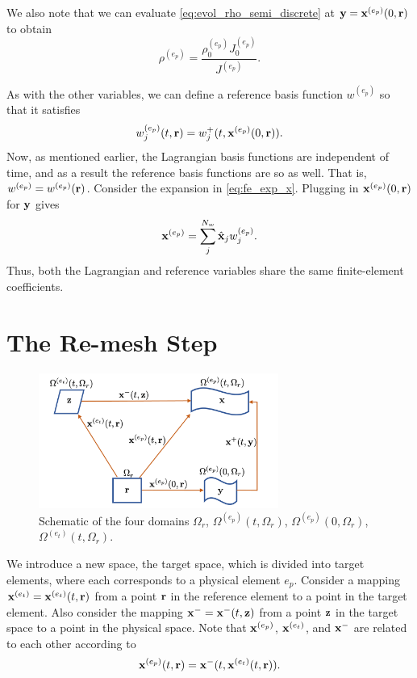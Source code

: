 \documentclass[11pt]{report}
\begin{document}
We also note that we can evaluate \cref{eq:evol_rho_semi_discrete} at $\mathbf{y} = \mathbf{x}^{(e_p)}(0,\mathbf{r})$ to obtain
\begin{equation}
    \rho^{(e_p)} = \frac{\rho^{(e_p)}_0 J^{(e_p)}_0}{J^{(e_p)}}.
\end{equation}

As with the other variables, we can define a reference basis function $w^{(e_p)}$ so that it satisfies
\begin{equation}
    w_j^{(e_p)}(t,\mathbf{r}) = w_j^+(t,\mathbf{x}^{(e_p)}(0,\mathbf{r})).
\end{equation}
Now, as mentioned earlier, the Lagrangian basis functions are independent of time, and as a result the reference basis functions are so as well. That is, $w^{(e_p)} = w^{(e_p)}(\mathbf{r})$. Consider the expansion in \cref{eq:fe_exp_x}. Plugging in $\mathbf{x}^{(e_p)}(0,\mathbf{r})$ for $\mathbf{y}$ gives
\begin{equation}
    \label{eq:re_exp_x}
    \mathbf{x}^{(e_p)} = \sum_j^{N_w} \hat{\mathbf{x}}_j w^{(e_p)}_j.
\end{equation}
Thus, both the Lagrangian and reference variables share the same finite-element coefficients.

\chapter{The Re-mesh Step}
\begin{figure}[ht]
    \centering
    \includegraphics[width=0.7\textwidth]{../../images/four_spaces.pdf}
    \caption{Schematic of the four domains $\Omega_r$, $\Omega^{(e_p)}(t,\Omega_r)$, $\Omega^{(e_p)}(0,\Omega_r)$, $\Omega^{(e_t)}(t,\Omega_r)$.}
    \label{fig:four_spaces}
 \end{figure}
We introduce a new space, the target space, which is divided into target elements, where each corresponds to a physical element $e_p$. Consider a mapping $\mathbf{x}^{(e_t)}=\mathbf{x}^{(e_t)}(t,\mathbf{r})$ from a point $\mathbf{r}$ in the reference element to a point in the target element. Also consider the mapping $\mathbf{x}^- = \mathbf{x}^-(t,\mathbf{z})$ from a point $\mathbf{z}$ in the target space to a point in the physical space. Note that $\mathbf{x}^{(e_p)}$, $\mathbf{x}^{(e_t)}$, and $\mathbf{x}^-$ are related to each other according to
\begin{equation}
    \label{eq:ref_elem_z_map}
    \mathbf{x}^{(e_p)}(t,\mathbf{r}) = \mathbf{x}^-(t,\mathbf{x}^{(e_t)}(t,\mathbf{r})).
\end{equation}
\end{document}
